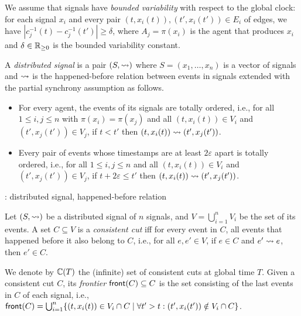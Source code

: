 We assume that signals have \emph{bounded variability} with respect to the global clock: for each signal $x_i$ and every pair $(t, x_i(t)), (t', x_i(t')) \in E_i$ of edges, we have $|c_j^{-1}(t) - c_j^{-1}(t')| \geq \delta$, where $A_j = \pi(x_i)$ is the agent that produces $x_i$ and $\delta \in \mathbb{R}_{\geq 0}$ is the bounded variability constant.

\begin{definition} \label{defn:hb}
	A \emph{distributed signal} is a pair $(S, {\rightsquigarrow})$ where $S = (x_1, \ldots, x_n)$ is a vector of signals and ${\rightsquigarrow}$ is the happened-before relation between events in signals extended with the partial synchrony assumption as follows.
	\begin{itemize}
		\item For every agent, the events of its signals are totally ordered, i.e., for all $1 \leq i,j \leq n$ with $\pi(x_i) = \pi(x_j)$ and all $(t, x_i(t)) \in V_i$ and $(t', x_j(t')) \in V_j$, if $t < t'$ then $(t, x_i(t)) \rightsquigarrow (t', x_j(t'))$.
		\item Every pair of events whose timestamps are at least $2 \varepsilon$ apart is totally ordered, i.e., for all $1 \leq i,j \leq n$ and all $(t, x_i(t)) \in V_i$ and $(t', x_j(t')) \in V_j$, if $t + 2\varepsilon \leq t'$ then $(t, x_i(t)) \rightsquigarrow (t', x_j(t'))$. 
	\end{itemize}
\end{definition}

\begin{example}
	\TODO: distributed signal, happened-before relation
\end{example}

\begin{definition}
	Let $(S, {\rightsquigarrow})$ be a distributed signal of $n$ signals, and $V = \bigcup_{i = 1}^{n} V_i$ be the set of its events.
	A set $C \subseteq V$ is a \emph{consistent cut} iff for every event in $C$, all events that happened before  it also belong to $C$, i.e., for all $e, e' \in V$, if $e \in C$ and $e' \rightsquigarrow e$, then $e' \in C$.
\end{definition}

We denote by $\mathbb{C}(T)$ the (infinite) set of consistent cuts at global time $T$.
Given a consistent cut $C$, its \emph{frontier} $\mathsf{front}(C) \subseteq C$ is the set consisting of the last events in $C$ of each signal, i.e., $\fr(C) = \bigcup_{i = 1}^{n} \{ (t, x_i(t)) \in V_i \cap C \st \forall t' > t : (t', x_i(t')) \notin V_i \cap C \}$.

